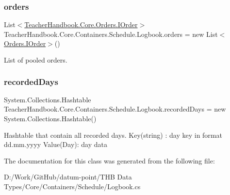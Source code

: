 \subsubsection{\texorpdfstring{orders}{orders}}
{\footnotesize\ttfamily List$<$\mbox{\hyperlink{interface_teacher_handbook_1_1_core_1_1_orders_1_1_i_order}{Teacher\+Handbook.\+Core.\+Orders.\+I\+Order}}$>$ Teacher\+Handbook.\+Core.\+Containers.\+Schedule.\+Logbook.\+orders = new List$<$\mbox{\hyperlink{interface_teacher_handbook_1_1_core_1_1_orders_1_1_i_order}{Orders.\+I\+Order}}$>$()\hspace{0.3cm}{\ttfamily [protected]}}



List of pooled orders. 

\mbox{\label{class_teacher_handbook_1_1_core_1_1_containers_1_1_schedule_1_1_logbook_ac848ae0c5ec991bae660417d0b96a13c}} 
\subsubsection{\texorpdfstring{recorded\+Days}{recordedDays}}
{\footnotesize\ttfamily System.\+Collections.\+Hashtable Teacher\+Handbook.\+Core.\+Containers.\+Schedule.\+Logbook.\+recorded\+Days = new System.\+Collections.\+Hashtable()\hspace{0.3cm}{\ttfamily [protected]}}



Hashtable that contain all recorded days. Key(string) \+: day key in format dd.\+mm.\+yyyy Value(\+Day)\+: day data 



The documentation for this class was generated from the following file\+:\begin{DoxyCompactItemize}
\item 
D\+:/\+Work/\+Git\+Hub/datum-\/point/\+T\+H\+B Data Types/\+Core/\+Containers/\+Schedule/Logbook.\+cs\end{DoxyCompactItemize}
